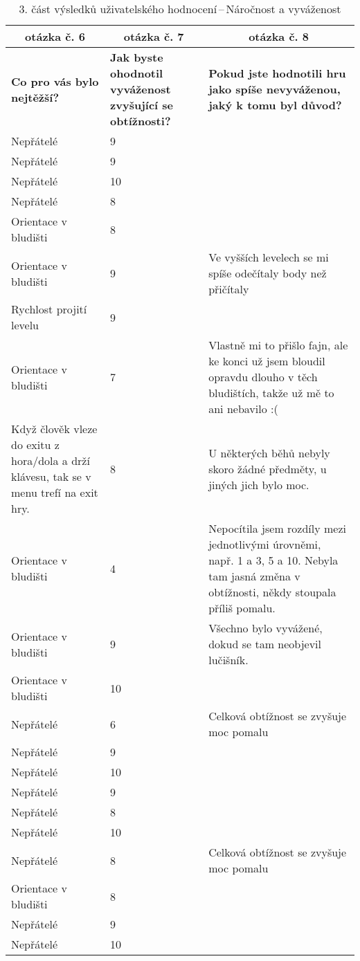 \begin{table}[htbp]
\centering
\begin{tabularx}{\textwidth}{|X|X|X|}
\hline
\multicolumn{1}{|c|}{\textbf{otázka č. 6}} & \multicolumn{1}{c|}{\textbf{otázka č. 7}} & \multicolumn{1}{c|}{\textbf{otázka č. 8}} \\ \hline
\textbf{Co pro vás bylo nejtěžší?} & \textbf{Jak byste ohodnotil vyváženost zvyšující se obtížnosti?} & \textbf{Pokud jste hodnotili hru jako spíše nevyváženou, jaký k tomu byl důvod?} \\ \hline
Nepřátelé & 9 & \\ \hline
Nepřátelé & 9 & \\ \hline
Nepřátelé & 10 & \\ \hline
Nepřátelé & 8 & \\ \hline
Orientace v bludišti & 8 & \\ \hline
Orientace v bludišti & 9 & Ve vyšších levelech se mi spíše odečítaly body než přičítaly \\ \hline
Rychlost projití levelu & 9 & \\ \hline
Orientace v bludišti & 7 & Vlastně mi to přišlo fajn, ale ke konci už jsem bloudil opravdu dlouho v těch bludištích, takže už mě to ani nebavilo :( \\ \hline
Když člověk vleze do exitu z hora/dola a drží klávesu, tak se v menu trefí na exit hry. & 8 & U některých běhů nebyly skoro žádné předměty, u jiných jich bylo moc. \\ \hline
Orientace v bludišti & 4 & Nepocítila jsem rozdíly mezi jednotlivými úrovněmi, např. 1 a 3, 5 a 10. Nebyla tam jasná změna v obtížnosti, někdy stoupala příliš pomalu. \\ \hline
Orientace v bludišti & 9 & Všechno bylo vyvážené, dokud se tam neobjevil lučišník. \\ \hline
Orientace v bludišti & 10 & \\ \hline
Nepřátelé & 6 & Celková obtížnost se zvyšuje moc pomalu \\ \hline
Nepřátelé & 9 & \\ \hline
Nepřátelé & 10 & \\ \hline
Nepřátelé & 9 & \\ \hline
Nepřátelé & 8 & \\ \hline
Nepřátelé & 10 & \\ \hline
Nepřátelé & 8 & Celková obtížnost se zvyšuje moc pomalu \\ \hline
Orientace v bludišti & 8 & \\ \hline
Nepřátelé & 9 & \\ \hline
Nepřátelé & 10 & \\ \hline
\end{tabularx}
\caption{3. část výsledků uživatelského hodnocení\,--\,Náročnost a vyváženost}
\end{table}

